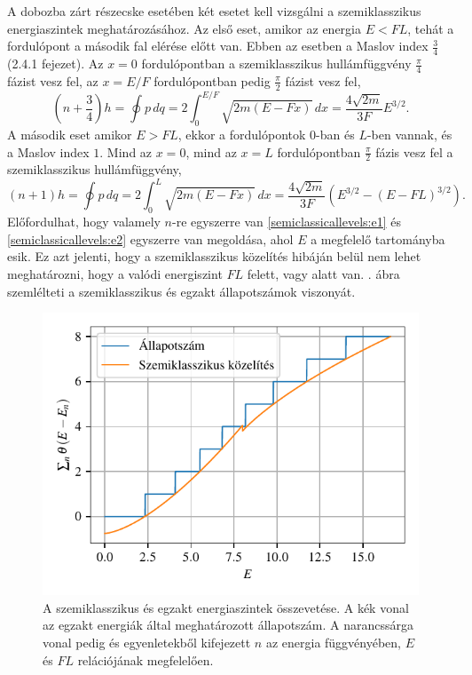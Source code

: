 A dobozba zárt részecske esetében két esetet kell vizsgálni a szemiklasszikus energiaszintek meghatározásához. Az első eset, amikor az energia $E < FL$, tehát a fordulópont a második fal elérése előtt van. Ebben az esetben a Maslov index $\frac{3}{4}$ \cite{brack:semiclassical} (2.4.1 fejezet). Az $x=0$ fordulópontban a szemiklasszikus hullámfüggvény $\frac{\pi}{4}$ fázist vesz fel, az $x=E/F$ fordulópontban pedig $\frac{\pi}{2}$ fázist vesz fel,
\begin{equation}
	\left(n+\frac{3}{4}\right)h=\oint p\,dq=2\int_0^{E/F}\sqrt{2m\left( E-Fx \right)}\,dx=\frac{4\sqrt{2m}}{3F}E^{3/2}.
	\label{semiclassicallevels:e1}
\end{equation}
A második eset amikor $E > FL$, ekkor a fordulópontok $0$-ban és $L$-ben vannak, és a Maslov index $1$. Mind az $x=0$, mind az $x=L$ fordulópontban $\frac{\pi}{2}$ fázis vesz fel a szemiklasszikus hullámfüggvény,
\begin{equation}
	\left(n+1\right)h=\oint p\,dq=2\int_0^{L}\sqrt{2m\left(E-Fx\right)}\,dx=\frac{4\sqrt{2m}}{3F}\left(E^{3/2}-\left(E-FL\right)^{3/2}\right).
	\label{semiclassicallevels:e2}
\end{equation}
Előfordulhat, hogy valamely $n$-re egyszerre van \eqref{semiclassicallevels:e1} és \eqref{semiclassicallevels:e2} egyszerre van megoldása, ahol $E$ a megfelelő tartományba esik. Ez azt jelenti, hogy a szemiklasszikus közelítés hibáján belül nem lehet meghatározni, hogy a valódi energiszint $FL$ felett, vagy alatt van. . ábra szemlélteti a szemiklasszikus és egzakt állapotszámok viszonyát.
\begin{figure}[H]
	\centering
	\includegraphics[scale=1]{./figs/allapotszam.pdf}
	\caption[Szemiklasszikus állapotszám]{A szemiklasszikus és egzakt energiaszintek összevetése. A kék vonal az egzakt energiák által meghatározott állapotszám. A narancssárga vonal pedig  és  egyenletekből kifejezett $n$ az energia függvényében, $E$ és $FL$ relációjának megfelelően.}
	\label{semiclassicallevels:allapotszam}
\end{figure}
